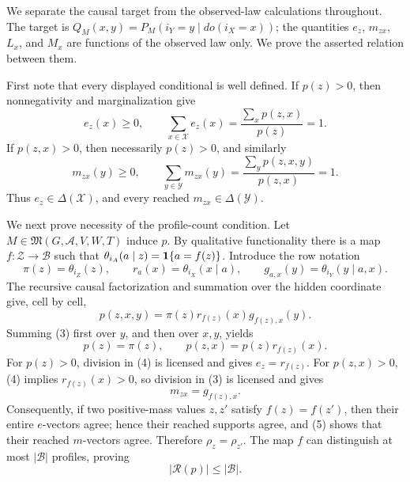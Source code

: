 We separate the causal target from the observed-law calculations throughout.
The target is \(Q_M(x,y)=P_M(i_Y=y\mid do(i_X=x))\); the quantities
\(e_z\), \(m_{zx}\), \(L_x\), and \(M_x\) are functions of the observed
law only.  We prove the asserted relation between them.

First note that every displayed conditional is well defined.  If
\(p(z)>0\), then nonnegativity and marginalization give
\[
 e_z(x)\geq0,
 \qquad
 \sum_{x\in\mathcal X}e_z(x)
 =\frac{\sum_xp(z,x)}{p(z)}=1.
\tag{1}
\]
If \(p(z,x)>0\), then necessarily \(p(z)>0\), and similarly
\[
 m_{zx}(y)\geq0,
 \qquad
 \sum_{y\in\mathcal Y}m_{zx}(y)
 =\frac{\sum_yp(z,x,y)}{p(z,x)}=1.
\tag{2}
\]
Thus \(e_z\in\Delta(\mathcal X)\), and every reached
\(m_{zx}\in\Delta(\mathcal Y)\).

We next prove necessity of the profile-count condition.  Let
\(M\in\mathfrak M(G,\mathcal A,V,W,T)\) induce \(p\).  By
qualitative functionality there is a map
\(f:\mathcal Z\to\mathcal B\) such that
\(\theta_{i_A}(a\mid z)={\bf 1}\{a=f(z)\}\).  Introduce the row notation
\[
 \pi(z)=\theta_{i_Z}(z),\qquad
 r_a(x)=\theta_{i_X}(x\mid a),\qquad
 g_{a,x}(y)=\theta_{i_Y}(y\mid a,x).
\]
The recursive causal factorization and summation over the hidden coordinate
give, cell by cell,
\[
 p(z,x,y)=\pi(z)r_{f(z)}(x)g_{f(z),x}(y).
\tag{3}
\]
Summing (3) first over \(y\), and then over \(x,y\), yields
\[
 p(z)=\pi(z),
 \qquad
 p(z,x)=p(z)r_{f(z)}(x).
\tag{4}
\]
For \(p(z)>0\), division in (4) is licensed and gives
\(e_z=r_{f(z)}\).  For \(p(z,x)>0\), (4) implies
\(r_{f(z)}(x)>0\), so division in (3) is licensed and gives
\[
 m_{zx}=g_{f(z),x}.
\tag{5}
\]
Consequently, if two positive-mass values \(z,z'\) satisfy
\(f(z)=f(z')\), then their entire \(e\)-vectors agree; hence their reached
supports agree, and (5) shows that their reached \(m\)-vectors agree.
Therefore \(\rho_z=\rho_{z'}\).  The map \(f\) can distinguish at most
\(\lvert\mathcal B\rvert\) profiles, proving
\[
 \lvert\mathcal R(p)\rvert\leq\lvert\mathcal B\rvert.
\tag{6}
\]

